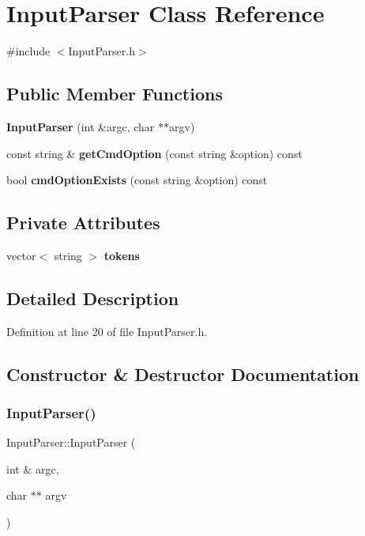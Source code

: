 \section{Input\+Parser Class Reference}
\label{class_input_parser}


{\ttfamily \#include $<$Input\+Parser.\+h$>$}

\subsection*{Public Member Functions}
\begin{DoxyCompactItemize}
\item 
\textbf{ Input\+Parser} (int \&argc, char $\ast$$\ast$argv)
\item 
const string \& \textbf{ get\+Cmd\+Option} (const string \&option) const
\item 
bool \textbf{ cmd\+Option\+Exists} (const string \&option) const
\end{DoxyCompactItemize}
\subsection*{Private Attributes}
\begin{DoxyCompactItemize}
\item 
vector$<$ string $>$ \textbf{ tokens}
\end{DoxyCompactItemize}


\subsection{Detailed Description}


Definition at line 20 of file Input\+Parser.\+h.



\subsection{Constructor \& Destructor Documentation}
\mbox{\label{class_input_parser_af9fa5ead1f28b5294a713410df5b9531}} 
\subsubsection{InputParser()}
{\footnotesize\ttfamily Input\+Parser\+::\+Input\+Parser (\begin{DoxyParamCaption}\item[{int \&}]{argc,  }\item[{char $\ast$$\ast$}]{argv }\end{DoxyParamCaption})}



